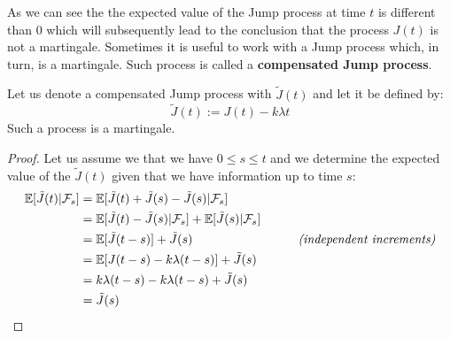 \documentclass[times, utf8, diplomski]{fer}
\begin{document}
		\begin{center}
		\end{center}

		\noindent As we can see the the expected value of the Jump process at time $t$ is different than $0$ which will subsequently lead to the conclusion that the process $J(t)$ is not a martingale. Sometimes it is useful to work with a Jump process which, in turn, is a martingale. Such process is called a \textbf{compensated Jump process}. 
		
		\begin{proposition} Let us denote a compensated Jump process with $\tilde{J}(t)$ and let it be defined by:
			\begin{equation}
			\tilde{J}(t) := J(t) - k\lambda t
			\end{equation}
			Such a process is a martingale.
		\end{proposition}
		\begin{proof}
			Let us assume we that we have $0 \leq s \leq t$ and we determine the expected value of the $\tilde{J}(t)$ given that we have information up to time $s$:
			\begin{align*}
				\mathbb{E}[\tilde{J}(t)|\mathcal{F}_s] &= \mathbb{E}[\tilde{J}(t) + \tilde{J}(s) - \tilde{J}(s)|\mathcal{F}_s] \\
				&= \mathbb{E}[\tilde{J}(t) - \tilde{J}(s)|\mathcal{F}_s] + \mathbb{E}[\tilde{J}(s)|\mathcal{F}_s] \\
				&= \mathbb{E}[\tilde{J}(t - s)] + \tilde{J}(s) \hspace{3cm} \mbox{\textit{(independent increments)}} \\
				&= \mathbb{E}[J(t - s) - k\lambda (t-s)] + \tilde{J}(s)\\
				&= k\lambda (t-s) - k\lambda (t-s) + \tilde{J}(s) \\
				&= \tilde{J}(s)
			\end{align*}
		\end{proof}
\end{document}
